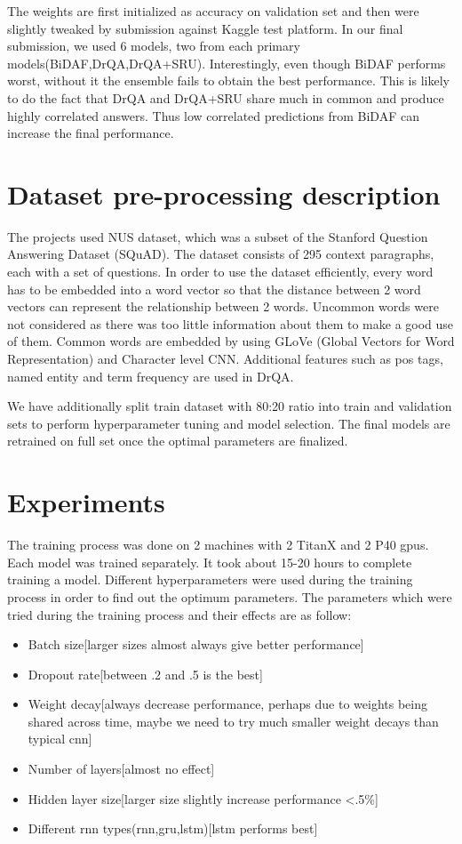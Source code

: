 \documentclass[paper=a4, fontsize=11pt]{scrartcl} %
\begin{document}
The weights are first initialized as accuracy on validation set and then were slightly tweaked by submission against Kaggle test platform. In our final submission, we used 6 models, two from each primary models(BiDAF,DrQA,DrQA+SRU). Interestingly, even though BiDAF performs worst, without it the ensemble fails to obtain the best performance. This is likely to do the fact that DrQA and DrQA+SRU share much in common and produce highly correlated answers. Thus low correlated predictions from BiDAF can increase the final performance.


\section{Dataset pre-processing description}
The projects used NUS dataset, which was a subset of the Stanford Question Answering Dataset (SQuAD). The dataset consists of 295 context paragraphs, each with a set of questions. In order to use the dataset efficiently, every word has to be embedded into a word vector so that the distance between 2 word vectors can represent the relationship between 2 words. Uncommon words were not considered as there was too little information about them to make a good use of them. Common words are embedded by using GLoVe (Global Vectors for Word Representation) and Character level CNN. Additional features such as pos tags, named entity and term frequency are used in DrQA.

We have additionally split train dataset with 80:20 ratio into train and validation sets to perform hyperparameter tuning and model selection. The final models are retrained on full set once the optimal parameters are finalized.

\section{Experiments}
The training process was done on 2 machines with 2 TitanX and 2 P40 gpus. Each model was trained separately. It took about 15-20 hours to complete training a model. Different hyperparameters were used during the training process in order to find out the optimum parameters. The parameters which were tried during the training process and their effects are as follow:

\begin{itemize}
	\item Batch size[larger sizes almost always give better performance]
	\item Dropout rate[between .2 and .5 is the best]	
	\item Weight decay[always decrease performance, perhaps due to weights being shared across time, maybe we need to try much smaller weight decays than typical cnn]
	\item Number of layers[almost no effect]
	\item Hidden layer size[larger size slightly increase performance <.5\%]
	\item Different rnn types(rnn,gru,lstm)[lstm performs best]
\end{itemize}
\end{document}
